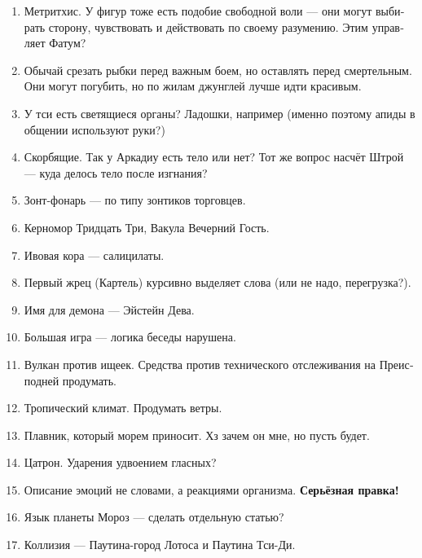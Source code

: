 \documentclass[a4paper,12pt,fleqn]{book}\usepackage{polyglossia}\setdefaultlanguage[babelshorthands=true]{russian}\setotherlanguage{english}\defaultfontfeatures{Ligatures=TeX,Mapping=tex-text}\usepackage{xcolor}\newcommand{\ml}[3]{#2}
\begin{document}
{\begin{enumerate}
\item Метритхис.
У фигур тоже есть подобие свободной воли --- они могут выбирать сторону, чувствовать и действовать по своему разумению.
Этим управляет Фатум?

\item Обычай срезать рыбки перед важным боем, но оставлять перед смертельным.
Они могут погубить, но по жилам джунглей лучше идти красивым.

\item У тси есть светящиеся органы?
Ладошки, например (именно поэтому апиды в общении используют руки?)

\item Скорбящие.
Так у Аркадиу есть тело или нет?
Тот же вопрос насчёт Штрой --- куда делось тело после изгнания?

\item Зонт-фонарь --- по типу зонтиков торговцев.

\item Керномор Тридцать Три, Вакула Вечерний Гость.

\item Ивовая кора --- салицилаты.

\item Первый жрец (Картель) курсивно выделяет слова (или не надо, перегрузка?).

\item Имя для демона --- Эйстейн Дева.

\item Большая игра --- логика беседы нарушена.

\item Вулкан против ищеек.
Средства против технического отслеживания на Преисподней продумать.

\item Тропический климат.
Продумать ветры.

\item Плавник, который морем приносит.
Хз зачем он мне, но пусть будет.

\item Цатрон.
Ударения удвоением гласных?

\item Описание эмоций не словами, а реакциями организма.
\textbf{Серьёзная правка!}

\item Язык планеты Мороз --- сделать отдельную статью?

\item Коллизия --- Паутина-город Лотоса и Паутина Тси-Ди.


\end{enumerate}}
\end{document}
